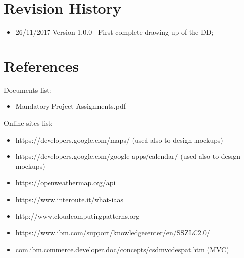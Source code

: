 \section{Revision History}
\begin{itemize}
\item	26/11/2017 Version 1.0.0 - First complete drawing up of the DD;
\end{itemize}
%
%
\section{References}
Documents list:
\begin{itemize}
\item Mandatory Project Assignments.pdf
\end{itemize}
Online sites list:
\begin{itemize}
\item	https://developers.google.com/maps/ (used also to design mockups)
\item	https://developers.google.com/google-apps/calendar/ (used also to design mockups)
\item	https://openweathermap.org/api
\item	https://www.interoute.it/what-iaas
\item	http://www.cloudcomputingpatterns.org
\item	https://www.ibm.com/support/knowledgecenter/en/SSZLC2.0/
\item	com.ibm.commerce.developer.doc/concepts/csdmvcdespat.htm (MVC)
\end{itemize}
%
%
